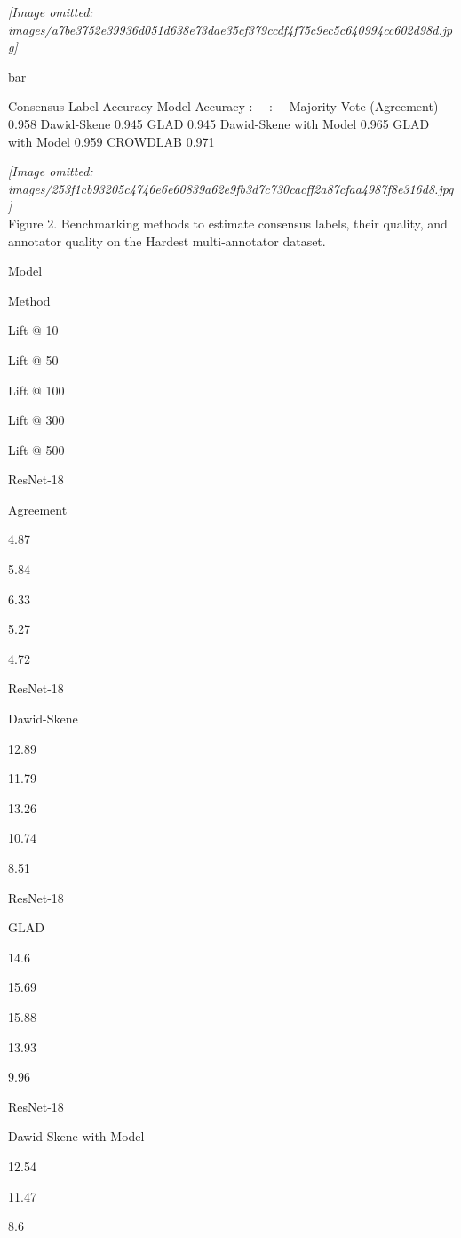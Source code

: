 \documentclass[
]{article}
\begin{document}
\textit{[Image omitted: images/a7be3752e39936d051d638e73dae35cf379ccdf4f75c9ec5c640994cc602d98d.jpg]}

bar

Consensus Label Accuracy \textbar{} Model \textbar{} Accuracy \textbar{}
\textbar{} :--- \textbar{} :--- \textbar{} \textbar{} Majority Vote
(Agreement) \textbar{} 0.958 \textbar{} \textbar{} Dawid-Skene
\textbar{} 0.945 \textbar{} \textbar{} GLAD \textbar{} 0.945 \textbar{}
\textbar{} Dawid-Skene with Model \textbar{} 0.965 \textbar{} \textbar{}
GLAD with Model \textbar{} 0.959 \textbar{} \textbar{} CROWDLAB
\textbar{} 0.971 \textbar{}

\textit{[Image omitted: images/253f1cb93205c4746e6e60839a62e9fb3d7c730cacff2a87cfaa4987f8e316d8.jpg]}\\
Figure 2. Benchmarking methods to estimate consensus labels, their
quality, and annotator quality on the Hardest multi-annotator dataset.

Model

Method

Lift @ 10

Lift @ 50

Lift @ 100

Lift @ 300

Lift @ 500

ResNet-18

Agreement

4.87

5.84

6.33

5.27

4.72

ResNet-18

Dawid-Skene

12.89

11.79

13.26

10.74

8.51

ResNet-18

GLAD

14.6

15.69

15.88

13.93

9.96

ResNet-18

Dawid-Skene with Model

12.54

11.47

8.6
\end{document}
